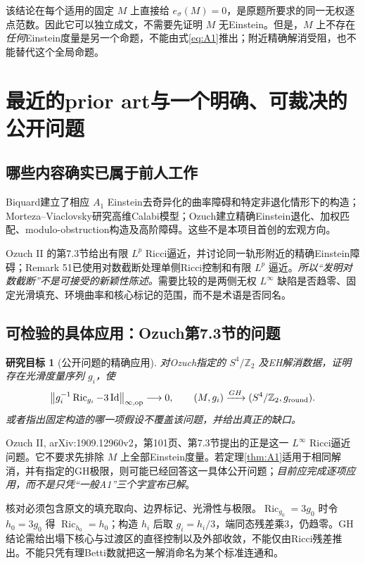 \documentclass[UTF8,a4paper,11pt,fontset=fandol]{ctexart}
\numberwithin{equation}{section}
\newtheorem{target}[theorem]{研究目标}
\theoremstyle{definition}
\newcommand{\Ric}{\operatorname{Ric}}
\newcommand{\Id}{\operatorname{Id}}
\newcommand{\op}{\mathrm{op}}
\newcommand{\Z}{\mathbb Z}
\newcommand{\norm}[1]{\left\lVert#1\right\rVert}
\begin{document}
该结论在每个适用的固定 $M$ 上直接给 $e_\sigma(M)=0$，是原题所要求的同一无权逐点范数。因此它可以独立成文，不需要先证明 $M$ 无Einstein。但是，$M$ 上不存在\emph{任何}Einstein度量是另一个命题，不能由式\eqref{eq:A1}推出；附近精确解消受阻，也不能替代这个全局命题。

\section{最近的prior art与一个明确、可裁决的公开问题}
\subsection{哪些内容确实已属于前人工作}
Biquard建立了相应 $A_1$ Einstein去奇异化的曲率障碍和特定非退化情形下的构造；Morteza--Viaclovsky研究高维Calabi模型；Ozuch建立精确Einstein退化、加权匹配、modulo-obstruction构造及高阶障碍\cite{Biquard,MV,OzuchI,OzuchII,OzuchHigher,OzuchIntegrability}。这些不是本项目首创的宏观方向。

Ozuch II 的第7.3节给出有限 $L^p$ Ricci逼近，并讨论同一轨形附近的精确Einstein障碍；Remark 51已使用对数截断处理单侧Ricci控制和有限 $L^p$ 逼近。\emph{所以“发明对数截断”不是可接受的新颖性陈述。}需要比较的是两侧无权 $L^\infty$ 缺陷是否趋零、固定光滑填充、环境曲率和核心标记的范围，而不是术语是否同名\cite{OzuchII}。

\subsection{可检验的具体应用：Ozuch第7.3节的问题}
\begin{target}[公开问题的精确应用]\label{tar:football}
对Ozuch指定的 $S^4/\Z_2$ 及EH解消数据，证明存在光滑度量序列 $g_i$，使
\begin{equation}\label{eq:football}
\norm{g_i^{-1}\Ric_{g_i}-3\Id}_{\infty,\op}\longrightarrow0,
\qquad (M,g_i)\xrightarrow{GH}(S^4/\Z_2,g_{\rm round}).
\end{equation}
或者指出固定构造的哪一项假设不覆盖该问题，并给出真正的缺口。
\end{target}
Ozuch II, arXiv:1909.12960v2，第101页、第7.3节提出的正是这一 $L^\infty$ Ricci逼近问题\cite{OzuchII}。它不要求先排除 $M$ 上全部Einstein度量。若定理\ref{thm:A1}适用于相同解消，并有指定的GH极限，则可能已经回答这一具体公开问题；\emph{目前应完成逐项应用，而不是只凭“一般A1”三个字宣布已解}。

核对必须包含原文的填充取向、边界标记、光滑性与极限。$\Ric_{g_0}=3g_0$ 时令 $h_0=3g_0$ 得 $\Ric_{h_0}=h_0$；构造 $h_i$ 后取 $g_i=h_i/3$，端同态残差乘3，仍趋零。GH结论需给出塌下核心与过渡区的直径控制以及外部收敛，不能仅由Ricci残差推出。不能只凭有理Betti数就把这一解消命名为某个标准连通和。
\end{document}
